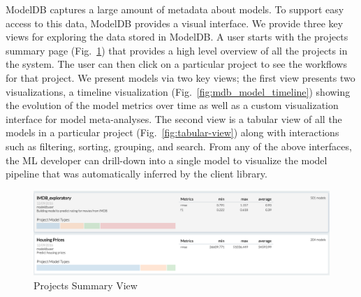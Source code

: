 \documentclass[11pt]{article}
\newcommand{\mdb}{{\sc ModelDB}\xspace}
\newcommand{\wfs}{workflows\xspace}
\newcommand{\mldev}{ML developer\xspace}
\begin{document}
\mdb captures a large amount of metadata about models.
To support easy access to this data, \mdb provides a visual interface.
We provide three key views for exploring the data stored in \mdb.
A user starts with the projects summary page (Fig.~\ref{fig:project-summary}) 
that provides a high level overview of all the projects in the system.
The user can then click on a particular project to see the \wfs for that
project.
We present models via two key views; the first view presents two visualizations, a timeline visualization (Fig.~\ref{fig:mdb_model_timeline}) showing the evolution of the model metrics over time as well as a custom visualization interface for model meta-analyses.
The second view is a tabular view of all the models in a particular project (Fig.~\ref{fig:tabular-view}) along with interactions such as filtering, sorting, grouping, and search.
From any of the above interfaces, the \mldev can drill-down into a single model to visualize the model pipeline that was automatically inferred by the client library.

\begin{figure}
  \centering
  \includegraphics[trim=0mm 0mm 0mm 0mm,
  clip=true, width=\textwidth]{figs/mdb_dashboard.png}
  \caption{\label{fig:project-summary} Projects Summary View}
\end{figure}

\end{document}
